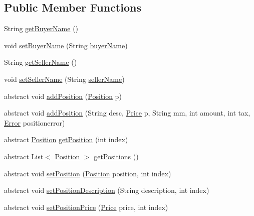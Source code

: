 \subsection*{Public Member Functions}
\begin{DoxyCompactItemize}
\item 
String \hyperlink{class_reduced_invoice_1_1_a_invoice_a0099d82cccbb09bc9240269c76c079d4}{get\-Buyer\-Name} ()
\item 
void \hyperlink{class_reduced_invoice_1_1_a_invoice_ab47710855319e2cf64a829d9bb37d243}{set\-Buyer\-Name} (String \hyperlink{class_reduced_invoice_1_1_a_invoice_ae75bdd20da8fa21dec01c2d032ac11c5}{buyer\-Name})
\item 
String \hyperlink{class_reduced_invoice_1_1_a_invoice_ac8973df8a999bc5556d697ed17c871f7}{get\-Seller\-Name} ()
\item 
void \hyperlink{class_reduced_invoice_1_1_a_invoice_a45129f98801ec280c52c2de35b48da0b}{set\-Seller\-Name} (String \hyperlink{class_reduced_invoice_1_1_a_invoice_ae00a97e1c74841fe0b0b43fccd1da24d}{seller\-Name})
\item 
abstract void \hyperlink{class_reduced_invoice_1_1_a_invoice_a29b30209d39ee91edee303ba5d36fd81}{add\-Position} (\hyperlink{class_reduced_invoice_1_1_position}{Position} p)
\item 
abstract void \hyperlink{class_reduced_invoice_1_1_a_invoice_a0ccc4c6c378676635b552e12c6a7d690}{add\-Position} (String desc, \hyperlink{class_reduced_invoice_1_1_price}{Price} p, String mm, int amount, int tax, \hyperlink{enum_reduced_invoice_1_1_a_invoice_1_1_error}{Error} positionerror)
\item 
abstract \hyperlink{class_reduced_invoice_1_1_position}{Position} \hyperlink{class_reduced_invoice_1_1_a_invoice_a1264648436c734afc549b2d1adb20ff6}{get\-Position} (int index)
\item 
abstract List$<$ \hyperlink{class_reduced_invoice_1_1_position}{Position} $>$ \hyperlink{class_reduced_invoice_1_1_a_invoice_a62a407f4bec81c5dbd392f68ecff6582}{get\-Positions} ()
\item 
abstract void \hyperlink{class_reduced_invoice_1_1_a_invoice_a3abfa40d89bdc9f56daaf73adafcca5e}{set\-Position} (\hyperlink{class_reduced_invoice_1_1_position}{Position} position, int index)
\item 
abstract void \hyperlink{class_reduced_invoice_1_1_a_invoice_a01a6d1c001117851fdcb6941a117c086}{set\-Position\-Description} (String description, int index)
\item 
abstract void \hyperlink{class_reduced_invoice_1_1_a_invoice_a0fb3b8175eac0e76c906a986ba7d6161}{set\-Position\-Price} (\hyperlink{class_reduced_invoice_1_1_price}{Price} price, int index)

\end{DoxyCompactItemize}
